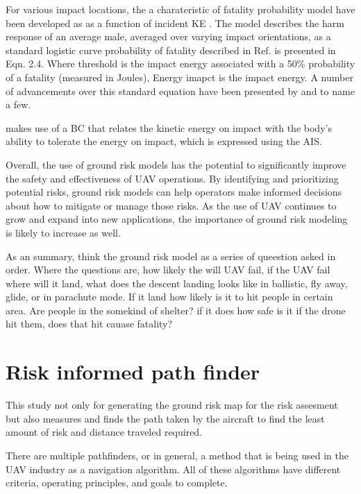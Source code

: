 \documentclass[12pt]{report}
\begin{document}
            For various impact locations, the a charateristic of fatality probability model have been developed as as a
            function of incident KE \cite{harwick_approved_2007}. The model describes the harm response of an average male, averaged over
            varying impact orientations, as a standard logistic curve probability of fatality described in Ref. \cite{shelley_model_2016} is
            presented in Eqn. 2.4. Where threshold is the impact energy associated with a 50\% probability of a fatality
            (measured in Joules), Energy imapct is the impact energy. A number of advancements over this standard
            equation have been presented by \cite{dalamagkidis_evaluating_2008} and \cite{shelley_model_2016} to name a few.

            \cite{magister_small_2010} makes use of a \ac{BC} that relates the kinetic energy on impact with the body's ability to
            tolerate the energy on impact, which is expressed using the \ac{AIS}.

        Overall, the use of ground risk models has the potential to significantly improve the safety and
        effectiveness of UAV operations. By identifying and prioritizing potential risks, ground risk models can help
        operators make informed decisions about how to mitigate or manage those risks. As the use of UAV continues to
        grow and expand into new applications, the importance of ground risk modeling is likely to increase as well.

        As an summary, think the ground risk model as a series of queestion asked in order. Where the questions are, how
        likely the will UAV fail, if the UAV fail where will it land, what does the descent landing looks like in
        ballistic, fly away, glide, or in parachute mode. If it land how likely is it to hit people in certain area. Are
        people in the somekind of shelter? if it does how safe is it if the drone hit them, does that hit cauase
        fatality?
        
    \section{Risk informed path finder}
        This study not only for generating the ground risk map for the risk assesment but also measures and finds the
        path taken by the aircraft to find the least amount of risk and distance traveled required. 
        
        There are multiple pathfinders, or in general, a method that is being used in the UAV industry as a navigation
        algorithm. All of these algorithms have different criteria, operating principles, and goals to complete.
        
\end{document}
